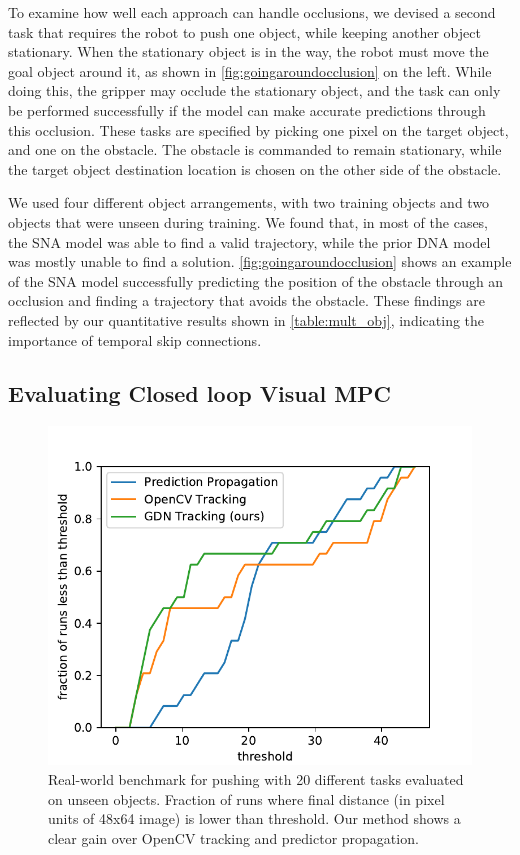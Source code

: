 To examine how well each approach can handle occlusions, we devised a second task that requires the robot to push one object, while keeping another object stationary. When the stationary object is in the way, the robot must move the goal object around it, as shown in \autoref{fig:goingaroundocclusion} on the left. While doing this, the gripper may occlude the stationary object, and the task can only be performed successfully if the model can make accurate predictions through this occlusion. These tasks are specified by picking one pixel on the target object, and one on the obstacle. The obstacle is commanded to remain stationary, while the target object destination location is chosen on the other side of the obstacle.

We used four different object arrangements, with two training objects and two objects that were unseen during training. We found that, in most of the cases, the SNA model was able to find a valid trajectory, while the prior DNA model was mostly unable to find a solution. \autoref{fig:goingaroundocclusion} shows an example of the SNA model successfully predicting the position of the obstacle through an occlusion and finding a trajectory that avoids the obstacle. These findings are reflected by our quantitative results shown in \autoref{table:mult_obj}, indicating the importance of temporal skip connections.

\subsection{Evaluating Closed loop Visual MPC}

\begin{figure}
\centering
\includegraphics[width=.7\columnwidth]{images_rfr/pushing_score_cdf_robot.pdf}
\caption{\small{Real-world benchmark for pushing with 20 different tasks evaluated on unseen objects. Fraction of runs where final distance (in pixel units of 48x64 image) is lower than threshold. Our method shows a clear gain over OpenCV tracking and predictor propagation.}}
\label{fig:push_bench}
\end{figure}

